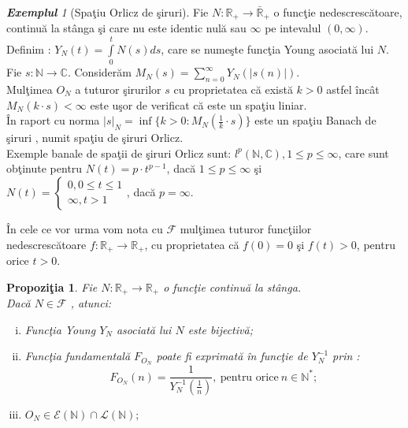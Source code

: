 \documentclass[ a4paper, 12pt]{report}
\newtheorem{prop}[theorem]{\bf Propozi\c tia }
\theoremstyle{definition}
\theoremstyle{remark}
\newtheorem{exemple}{\bf Exemplul}[section]
\numberwithin{equation}{section}
\begin{document}
\begin{exemple}[Spa\c tiu Orlicz de \c siruri]
Fie $N : \mathbb{R}_{+} \rightarrow \bar{\mathbb{R}}_{+}$ o func\c tie nedescresc\u atoare, continu\u a la st\^anga \c si care nu este identic nul\u a sau $\infty$ pe intevalul $(0,\infty)$.
 Definim : $ Y_N (t) = \int\limits_{0}^{t} N(s) ds$, care se nume\c ste func\c tia Young asociat\u a lui $N$.\\
Fie $s : \mathbb{N} \rightarrow \mathbb{C}$.
Consider\u am $M_N (s)= \sum\limits_{n=0}^{\infty} Y_N(\lvert s(n) \rvert).$\\
Mul\c timea $O_N$ a tuturor \c sirurilor $s$ cu proprietatea c\u a exist\u a $k > 0$ astfel \^inc\^at $M_N(k \cdot s)< \infty$ este u\c sor de verificat c\u a este un spa\c tiu liniar.\\ \^In raport cu norma $\lvert s \rvert_N = \inf\{ k>0: M_N(\frac{1}{k} \cdot s) \}$ este un spa\c tiu Banach de \c siruri , numit spa\c tiu de \c siruri Orlicz.\\
Exemple banale de spa\c tii de \c siruri Orlicz sunt: $l^{p}(\mathbb{N},\mathbb{C}), 1 \leq p \leq \infty$, care sunt ob\c tinute pentru $N(t) = p \cdot t^{p-1}$, dac\u a $1 \leq p \leq \infty$ \c si\\ $N(t) = \begin{cases}
0, 0 \leq t \leq 1\\
\infty, t > 1
\end{cases}$, dac\u a $p =\infty$.
\end{exemple}
\^In cele ce vor urma vom nota cu $\mathcal{F}$ mul\c timea tuturor func\c tiilor \\
nedescresc\u atoare $f : \mathbb{R}_{+} \rightarrow \mathbb{R}_{+}$, cu proprietatea c\u a $f(0) = 0$ \c si  $f(t) > 0$, pentru orice $t > 0$.
\begin{prop}
Fie $N : \mathbb{R}_{+} \rightarrow \mathbb{R}_{+}$ o func\c tie continu\u a la st\^anga.\\
 Dac\u a $N \in \mathcal{F}$ , atunci:
\begin{enumerate}[(i)]
\item Func\c tia Young $Y_N$ asociat\u a lui $N$ este bijectiv\u a;
\item Func\c tia fundamental\u a $F_{O_{N}}$ poate fi exprimat\u a \^in func\c tie de $Y_N^{-1}$ prin :
\[ F_{O_{N}} (n) = \frac{1}{Y_{N}^{-1}(\frac{1}{n})},\ \mbox{pentru orice}\ n \in \mathbb{N}^{\ast};\]
\item $O_N \in \mathcal{E}(\mathbb{N}) \cap \mathcal{L}(\mathbb{N});$
\end{enumerate}
\end{prop}
\end{document}
